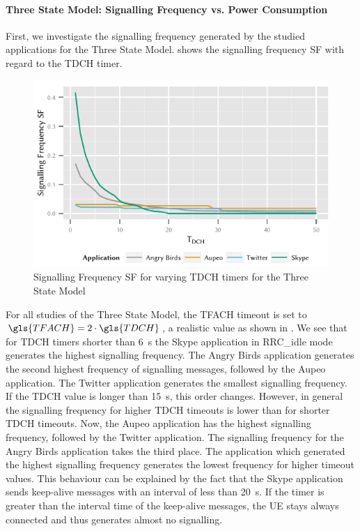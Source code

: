 \paragraph*{Three State Model: Signalling Frequency vs. Power Consumption}\label{sec:network:network_traces:numerical_results:three_states}
First, we investigate the signalling frequency generated by the studied applications for the Three State Model. 
 shows the signalling frequency \gls{SF} with regard to the \gls{TDCH} timer.
\begin{figure}
	\centering
	\includegraphics{network/network_traces/numerical_results/figures/3_state_tdch_vs_frequency}
	\caption{Signalling Frequency \gls{SF} for varying \gls{TDCH} timers for the Three State Model}\label{fig:network:network_traces:numerical_results:three_states:three_states:signalling}
\end{figure}
For all studies of the Three State Model, the \gls{TFACH} timeout is set to \(\gls{TFACH} = 2\cdot  \gls{TDCH}\), a realistic value as shown in \cite{Qian2011}.
We see that for \gls{TDCH} timers shorter than \SI{6}{\second} the Skype application in \gls{RRC_idle} mode generates the highest signalling frequency.
The Angry Birds application generates the second highest frequency of signalling messages, followed by the Aupeo application.
The Twitter application generates the smallest signalling frequency.
If the \gls{TDCH} value is longer than \SI{15}{\second}, this order changes.
However, in general the signalling frequency for higher \gls{TDCH} timeouts is lower than for shorter \gls{TDCH} timeouts.
Now, the Aupeo application has the highest signalling frequency, followed by the Twitter application.
The signalling frequency for the Angry Birds application takes the third place.
The application which generated the highest signalling frequency generates the lowest frequency for higher timeout values.
This behaviour can be explained by the fact that the Skype application sends keep-alive messages with an interval of less than \SI{20}{\second}.
If the timer is greater than the interval time of the keep-alive messages, the \gls{UE} stays always connected and thus generates almost no signalling.

